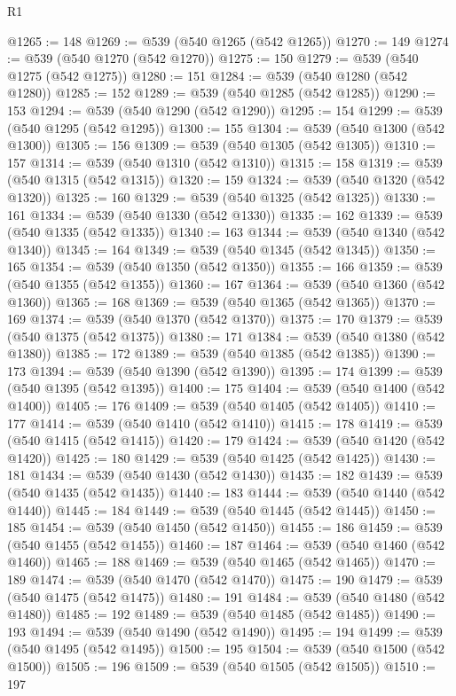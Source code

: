 \begin{lexlean}{R1}
\begin{coremodule}
{{{{{{{{{{{{{{{{{{{{{{{{{{{{{{{{{{{{{{{{@1265 := 148
@1269 := @539 (@540 @1265 (@542 @1265))
@1270 := 149
@1274 := @539 (@540 @1270 (@542 @1270))
@1275 := 150
@1279 := @539 (@540 @1275 (@542 @1275))
@1280 := 151
@1284 := @539 (@540 @1280 (@542 @1280))
@1285 := 152
@1289 := @539 (@540 @1285 (@542 @1285))
@1290 := 153
@1294 := @539 (@540 @1290 (@542 @1290))
@1295 := 154
@1299 := @539 (@540 @1295 (@542 @1295))
@1300 := 155
@1304 := @539 (@540 @1300 (@542 @1300))
@1305 := 156
@1309 := @539 (@540 @1305 (@542 @1305))
@1310 := 157
@1314 := @539 (@540 @1310 (@542 @1310))
@1315 := 158
@1319 := @539 (@540 @1315 (@542 @1315))
@1320 := 159
@1324 := @539 (@540 @1320 (@542 @1320))
@1325 := 160
@1329 := @539 (@540 @1325 (@542 @1325))
@1330 := 161
@1334 := @539 (@540 @1330 (@542 @1330))
@1335 := 162
@1339 := @539 (@540 @1335 (@542 @1335))
@1340 := 163
@1344 := @539 (@540 @1340 (@542 @1340))
@1345 := 164
@1349 := @539 (@540 @1345 (@542 @1345))
@1350 := 165
@1354 := @539 (@540 @1350 (@542 @1350))
@1355 := 166
@1359 := @539 (@540 @1355 (@542 @1355))
@1360 := 167
@1364 := @539 (@540 @1360 (@542 @1360))
@1365 := 168
@1369 := @539 (@540 @1365 (@542 @1365))
@1370 := 169
@1374 := @539 (@540 @1370 (@542 @1370))
@1375 := 170
@1379 := @539 (@540 @1375 (@542 @1375))
@1380 := 171
@1384 := @539 (@540 @1380 (@542 @1380))
@1385 := 172
@1389 := @539 (@540 @1385 (@542 @1385))
@1390 := 173
@1394 := @539 (@540 @1390 (@542 @1390))
@1395 := 174
@1399 := @539 (@540 @1395 (@542 @1395))
@1400 := 175
@1404 := @539 (@540 @1400 (@542 @1400))
@1405 := 176
@1409 := @539 (@540 @1405 (@542 @1405))
@1410 := 177
@1414 := @539 (@540 @1410 (@542 @1410))
@1415 := 178
@1419 := @539 (@540 @1415 (@542 @1415))
@1420 := 179
@1424 := @539 (@540 @1420 (@542 @1420))
@1425 := 180
@1429 := @539 (@540 @1425 (@542 @1425))
@1430 := 181
@1434 := @539 (@540 @1430 (@542 @1430))
@1435 := 182
@1439 := @539 (@540 @1435 (@542 @1435))
@1440 := 183
@1444 := @539 (@540 @1440 (@542 @1440))
@1445 := 184
@1449 := @539 (@540 @1445 (@542 @1445))
@1450 := 185
@1454 := @539 (@540 @1450 (@542 @1450))
@1455 := 186
@1459 := @539 (@540 @1455 (@542 @1455))
@1460 := 187
@1464 := @539 (@540 @1460 (@542 @1460))
@1465 := 188
@1469 := @539 (@540 @1465 (@542 @1465))
@1470 := 189
@1474 := @539 (@540 @1470 (@542 @1470))
@1475 := 190
@1479 := @539 (@540 @1475 (@542 @1475))
@1480 := 191
@1484 := @539 (@540 @1480 (@542 @1480))
@1485 := 192
@1489 := @539 (@540 @1485 (@542 @1485))
@1490 := 193
@1494 := @539 (@540 @1490 (@542 @1490))
@1495 := 194
@1499 := @539 (@540 @1495 (@542 @1495))
@1500 := 195
@1504 := @539 (@540 @1500 (@542 @1500))
@1505 := 196
@1509 := @539 (@540 @1505 (@542 @1505))
@1510 := 197
}}}}}}}}}}}}}}}}}}}}}}}}}}}}}}}}}}}}}}}}
\end{coremodule}
\end{lexlean}
